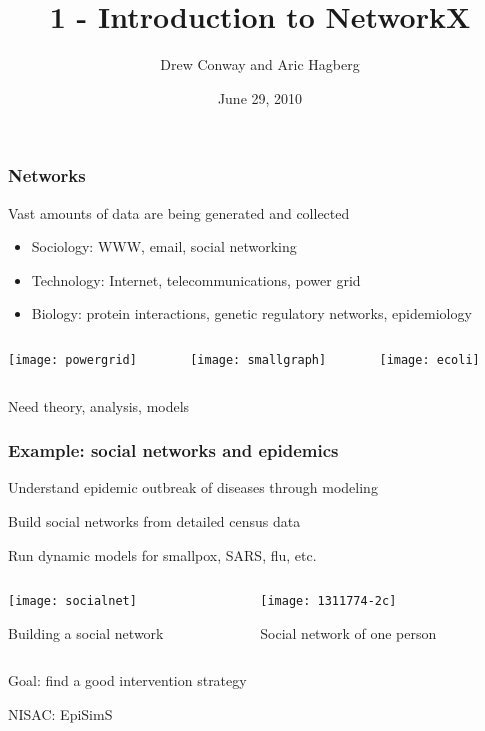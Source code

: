 \documentclass[xcolor=dvipsnames, 9pt]{beamer}
\title{1 - Introduction to NetworkX}
\author{Drew Conway and Aric Hagberg}
\date{June 29, 2010}
\begin{document}
\begin{frame}[plain]
\titlepage
\end{frame}

\begin{frame}
\frametitle{Networks}

Vast amounts of data are being generated and collected

\begin{itemize}
\item Sociology: WWW, email, social networking  
\item Technology: Internet, telecommunications, power grid
\item Biology: protein interactions, genetic regulatory networks, epidemiology
\end{itemize}

\begin{columns}[c]
\begin{column}{0.33\textwidth}
\centerline{\texttt{[image: powergrid]}}
\end{column}
\begin{column}{0.33\textwidth}
\centerline{\texttt{[image: smallgraph]}}
\end{column}
\begin{column}{0.33\textwidth}
\centerline{\texttt{[image: ecoli]}}
\end{column}
\end{columns}

\bigskip
Need theory, analysis, models 

\end{frame}

\begin{frame}
\frametitle{Example: social networks and epidemics}
Understand epidemic outbreak of diseases through modeling

Build social networks from detailed census data 

Run dynamic models for smallpox, SARS, flu, etc. 

\begin{columns}[c]
\begin{column}{0.65\textwidth}
\centerline{\texttt{[image: socialnet]}}
\centerline{\small Building a social network}
\end{column}
\begin{column}{0.35\textwidth}

\centerline{\texttt{[image: 1311774-2c]}}
\centerline{\small Social network of one person}
\end{column}
\end{columns}

Goal: find a good intervention strategy

\footnotesize
NISAC: EpiSimS
\end{frame}
\end{document}
